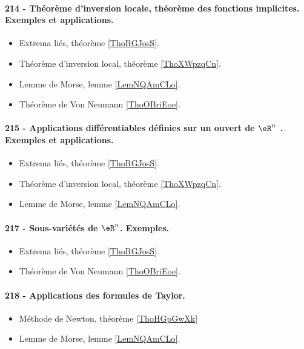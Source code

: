 \paragraph{214 - Théorème d’inversion locale, théorème des fonctions implicites. Exemples et applications.}
\begin{itemize}
    \item Extrema liés, théorème \ref{ThoRGJosS}.
    \item Théorème d'inversion local, théorème \ref{ThoXWpzqCn}.
    \item Lemme de Morse, lemme \ref{LemNQAmCLo}.
    \item Théorème de Von Neumann \ref{ThoOBriEoe}.
\end{itemize}
\paragraph{215 - Applications différentiables définies sur un ouvert de $\eR^n$ . Exemples et applications.}
\begin{itemize}
    \item Extrema liés, théorème \ref{ThoRGJosS}.
    \item Théorème d'inversion local, théorème \ref{ThoXWpzqCn}.
    \item Lemme de Morse, lemme \ref{LemNQAmCLo}.
\end{itemize}
\paragraph{217 - Sous-variétés de \( \eR^n\). Exemples.}
\begin{itemize}
    \item Extrema liés, théorème \ref{ThoRGJosS}.
    \item Théorème de Von Neumann \ref{ThoOBriEoe}.
\end{itemize}
\paragraph{218 - Applications des formules de Taylor.}
\begin{itemize}
    \item Méthode de Newton, théorème \ref{ThoHGpGwXk}
    \item Lemme de Morse, lemme \ref{LemNQAmCLo}.
\end{itemize}
